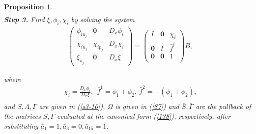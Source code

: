 \documentclass[12pt]{article}
\newtheorem{proposition}[theorem]{Proposition}
\begin{document}
\begin{proposition}
\begin{equation}
\begin{aligned}
\end{aligned}
\end{equation}
\textbf{Step 3.} Find $\xi, \phi_i, \chi_i$ by solving the system
\begin{equation}\label{169}
\begin{aligned}
&\begin{pmatrix}
\phi_{iu_j}&\textbf{0}&D_x\phi_i\\
\chi_{iu_j}&\chi_{ip_j}&D_x\chi_i\\
\xi_{u_j}&\textbf{0}&D_x\xi
\end{pmatrix}=\begin{pmatrix}
I&\textbf{0}&\chi_i\\
\textbf{0}&I&\bar{f}^i\\
\textbf{0}&\textbf{0}&1\\
\end{pmatrix}B,
\end{aligned}
\end{equation}

where
\begin{equation}
\begin{aligned}
&\chi_i=\frac{D_x\phi_i}{D_x\xi},~~\bar{f}^1=\phi_1+\phi_2,~\bar{f}^2=-(\phi_1+\phi_2),\\
\end{aligned}
\end{equation}
 and $S,\Lambda,\Gamma$ are given in (\ref{s3-10}), $\Omega$ is given in (\ref{87}) and $\bar{S}, \bar{\Gamma}$ are the pullback of the matrices $S, \Gamma$ evaluated at the canonical form (\ref{138}), respectively, after substituting $\bar{a}_1=1, \bar{a}_3=0, \bar{a}_{15}=1$.
\end{proposition}
\end{document}
